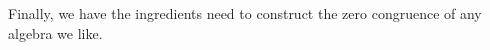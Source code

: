 \ccpad
Finally, we have the ingredients need to construct the zero congruence of any algebra we like.
\ccpad
\begin{code}%
\>[0]\AgdaSpace{}%
\AgdaSymbol{:}\AgdaSpace{}%
\AgdaSpace{}%
\AgdaSpace{}%
\AgdaSpace{}%
\AgdaSpace{}%
\AgdaSymbol{\{}\AgdaSpace{}%
\AgdaSymbol{:}\AgdaSpace{}%
\AgdaSpace{}%
\AgdaSpace{}%
\AgdaSymbol{\}}\AgdaSpace{}%
\AgdaSpace{}%
\AgdaSpace{}%
\<%
\\
\>[0]\AgdaSpace{}%
\AgdaSpace{}%
\AgdaSymbol{=}\AgdaSpace{}%
\AgdaSpace{}%
\AgdaSpace{}%
\AgdaSymbol{(}\AgdaSpace{}%
\AgdaSymbol{)}\AgdaSpace{}%
\<%
\end{code}

